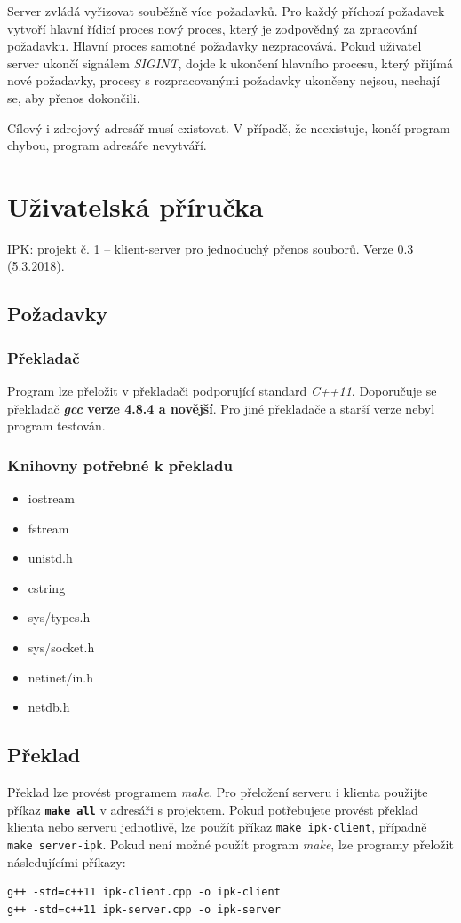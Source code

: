 \documentclass[11pt,a4paper]{article}
\begin{document}
Server zvládá vyřizovat souběžně více požadavků. Pro každý příchozí požadavek vytvoří hlavní řídicí proces nový proces, který je zodpovědný za zpracování požadavku. Hlavní proces samotné požadavky nezpracovává. Pokud uživatel server ukončí signálem \textit{SIGINT}, dojde k ukončení hlavního procesu, který přijímá nové požadavky, procesy s rozpracovanými požadavky ukončeny nejsou, nechají se, aby přenos dokončili.

Cílový i zdrojový adresář musí existovat. V případě, že neexistuje, končí program chybou, program adresáře nevytváří.

\section{Uživatelská příručka}
IPK: projekt č. 1 -- klient-server pro jednoduchý přenos souborů. Verze 0.3 (5.3.2018).
\subsection{Požadavky}
\subsubsection*{Překladač}
Program lze přeložit v překladači podporující standard \textit{C++11}. Doporučuje se překladač \textbf{\textit{gcc} verze 4.8.4 a novější}. Pro jiné překladače a starší verze nebyl program testován.
\subsubsection*{Knihovny potřebné k překladu}
\begin{itemize}
	\item iostream
	\item fstream
	\item unistd.h
	\item cstring
	\item sys/types.h
	\item sys/socket.h
	\item netinet/in.h
	\item netdb.h
\end{itemize}

\subsection{Překlad}
Překlad lze provést programem \textit{make}. Pro přeložení serveru i klienta použijte příkaz \textbf{\texttt{make all}} v adresáři s projektem. Pokud potřebujete provést překlad klienta nebo serveru jednotlivě, lze použít příkaz \texttt{make ipk-client}, případně \texttt{make server-ipk}.
Pokud není možné použít program \textit{make}, lze programy přeložit následujícími příkazy:
\begin{lstlisting}
g++ -std=c++11 ipk-client.cpp -o ipk-client
g++ -std=c++11 ipk-server.cpp -o ipk-server
\end{lstlisting}
\end{document}
